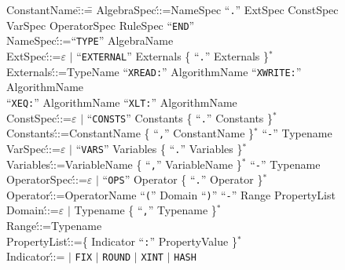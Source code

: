\begin{figure}[htbp]
\begin{center}
\begin{minipage}{5.9in} %
\begin{tabbing}
ConstantName\hspace{\tabbingsep}\=::=\hspace{\tabbingsep}\=\kill
\>AlgebraSpec\'::=\>NameSpec ``{\tt.}'' ExtSpec ConstSpec VarSpec OperatorSpec
      RuleSpec ``{\tt END}''\\
\>NameSpec\'::=\>``{\tt TYPE}'' AlgebraName\\
\>ExtSpec\'::=\>$\varepsilon$ $|$ ``{\tt EXTERNAL}'' Externals \{ ``{\tt.}''
      Externals \}$^\ast$\\
\>Externals\'::=\>TypeName ``{\tt XREAD:}'' AlgorithmName
                               ``{\tt XWRITE:}'' AlgorithmName\\
\>    \>      ``{\tt  XEQ:}'' AlgorithmName ``{\tt  XLT:}'' AlgorithmName \\
\>ConstSpec\'::=\>$\varepsilon$ $|$ ``{\tt CONSTS}'' Constants \{ ``{\tt.}''
      Constants \}$^\ast$\\
\>Constants\'::=\>ConstantName \{ ``{\tt ,}'' ConstantName \}$^\ast$
      ``{\tt -}'' Typename\\
\>VarSpec\'::=\>$\varepsilon$ $|$ ``{\tt VARS}'' Variables \{ ``{\tt .}''
      Variables \}$^\ast$\\
\>Variables\'::=\>VariableName \{ ``{\tt,}'' VariableName \}$^\ast$
      ``{\tt -}'' Typename\\
\>OperatorSpec\'::=\>$\varepsilon$ $|$ ``{\tt OPS}'' Operator \{ ``{\tt .}''
      Operator \}$^\ast$\\
\>Operator\'::=\>OperatorName ``{\tt(}'' Domain ``{\tt )}'' ``{\tt -}''
      Range PropertyList\\
\>Domain\'::=\>$\varepsilon$ $|$ Typename \{ ``{\tt,}'' Typename \}$^\ast$\\
\>Range\'::=\>Typename\\
\>PropertyList\'::=\>\{ Indicator ``{\tt :}'' PropertyValue \}$^\ast$\\
\>Indicator\'::=
      $|$ {\tt FIX} $|$ {\tt ROUND} $|$ {\tt XINT} $|$ {\tt HASH} 

\end{tabbing}
\end{minipage}
\end{center}
\end{figure}
